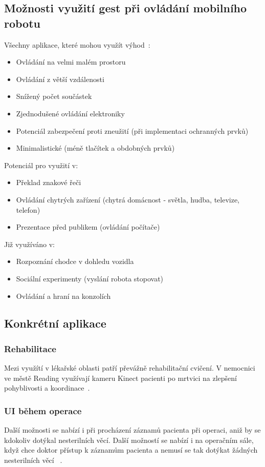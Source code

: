 \subsection{Možnosti využití gest při ovládání mobilního robotu}
Všechny aplikace, které mohou využít výhod~\cite{14}:
\begin{itemize}
\item Ovládání na velmi malém prostoru
\item Ovládání z větší vzdálenosti
\item Snížený počet součástek
\item Zjednodušené ovládání elektroniky
\item Potenciál zabezpečení proti zneužití (při implementaci ochranných prvků)
\item Minimalistické (méně tlačítek a obdobných prvků)\\
\end{itemize}
Potenciál pro využití v:
\begin{itemize}
\item Překlad znakové řeči
\item Ovládání chytrých zařízení (chytrá domácnost - světla, hudba, televize, telefon)
\item Prezentace před publikem (ovládání počítače)
\\
\end{itemize}
Již využíváno v:
\begin{itemize}
\item Rozpoznání chodce v dohledu vozidla
\item Sociální experimenty (vyslání robota stopovat)
\item Ovládání a hraní na konzolích
\end{itemize}

\subsection{Konkrétní aplikace}
\subsubsection{Rehabilitace}
Mezi využítí v lékařské oblasti patří převážně rehabilitační cvičení. V nemocnici ve městě Reading využívají kameru Kinect pacienti po mrtvici na zlepšení pohyblivosti a koordinace~\cite{21}. 

\subsubsection{UI během operace}
Další možnosti se nabízí i při procházení záznamů pacienta při operaci, aniž by se kdokoliv dotýkal nesterilních věcí. Další možností se nabízí i na operačním sále, když chce doktor přístup k záznamům pacienta a nemusí se tak dotýkat žádných nesterilních věcí ~\cite{24}.\\

